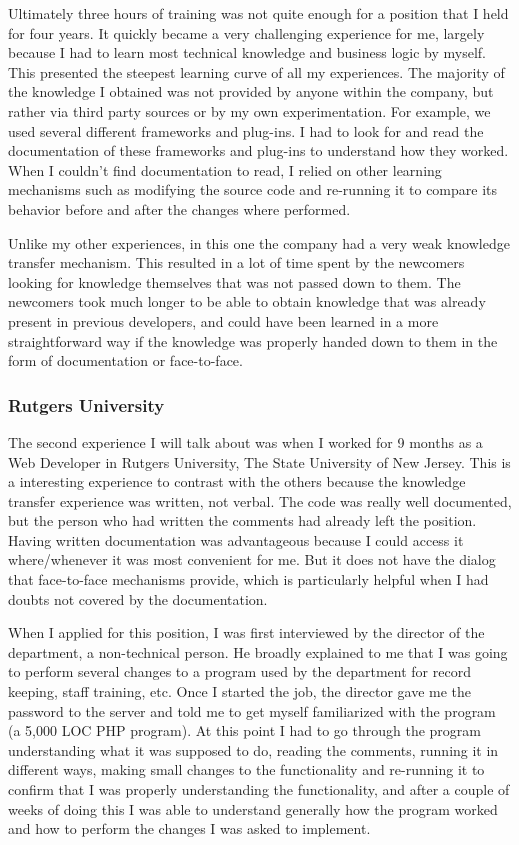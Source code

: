 \documentclass[12pt, letterpaper]{article}
\begin{document}
Ultimately three hours of training was not quite enough for a position that I held for four
years. It quickly became a very challenging experience for me, largely because I had to learn
most technical knowledge and business logic by myself. This presented the steepest learning curve of all my experiences. The 
majority of the knowledge I obtained was not provided by anyone within the company, but rather via third party
sources or by my own experimentation. For example, we used several different frameworks and plug-ins. 
I had to look for and read the documentation of 
these frameworks and plug-ins to understand how they worked. When I couldn't find documentation to read, I relied
on other learning mechanisms such as modifying the source code and re-running it to compare its behavior
before and after the changes where performed. 

Unlike my other experiences, in this one the company had a very weak knowledge transfer mechanism.
This resulted in a lot of time spent by the newcomers looking for knowledge themselves that was not passed down to them. 
The newcomers took much longer to be able to obtain knowledge that was already present in previous developers,
and could have been learned in a more straightforward way if the knowledge was properly handed down to them 
in the form of documentation or face-to-face.

\subsubsection{Rutgers University}
The second experience I will talk about was when I worked for 9 months as a Web Developer in Rutgers University, The
State University of New Jersey. This is a interesting experience to contrast with the others because the knowledge 
transfer experience was written, not verbal. The code was really well documented, but the person who had 
written the comments had already left the position. Having written documentation was advantageous because 
I could access it where/whenever it was most convenient for me. But it does not have the dialog that face-to-face
mechanisms provide, which is particularly helpful when I had doubts not covered by the documentation. 

When I applied for this position, I was first interviewed by the director of the department, 
a non-technical person. He broadly explained to me that I was going to 
perform several changes to a program used by the department for record keeping,
staff training, etc. Once I started the job, the director gave me the password to the server and told me to 
get myself familiarized with the program (a 5,000 LOC PHP program). At this point I had to go through
the program understanding what it was supposed to do, reading the comments, running it in different ways, making small 
changes to the 
functionality and re-running it to confirm that I was properly understanding the functionality, and after a couple of 
weeks of doing this I was able to understand generally how the program worked and how to perform the changes I was asked
to implement.
\end{document}
